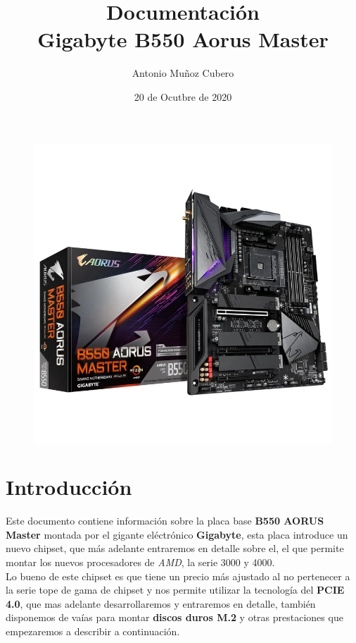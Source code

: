 \documentclass{article}
\title{Documentación \\\large \textbf{Gigabyte B550 Aorus Master}}
\author{Antonio Muñoz Cubero}
\date{20 de Ocutbre de 2020}
\begin{document}
  \maketitle

  \begin{figure}[h]
    \centering
    \includegraphics[scale = 0.5]{img/portada.png}
  \end{figure}

\pagestyle{fancy} 
  \newpage
    \tableofcontents

  \section{Introducción}
    Este documento contiene información sobre la placa base \textbf{B550 AORUS Master} montada por el gigante eléctrónico \textbf{Gigabyte}, esta placa introduce un nuevo chipset, que más adelante entraremos en detalle sobre el, 
    el  
    que permite montar los nuevos procesadores de \textit{AMD}, la serie 3000 y 4000.\\
    Lo bueno de este chipset es que tiene un precio más ajustado al no pertenecer a la serie tope de gama de chipset y nos permite utilizar la tecnología del \textbf{PCIE 4.0}, que mas adelante desarrollaremos y entraremos en 
    detalle, también 
    disponemos de vaías para montar \textbf{discos duros M.2} y otras prestaciones que empezaremos a describir a continuación.
\end{document}
